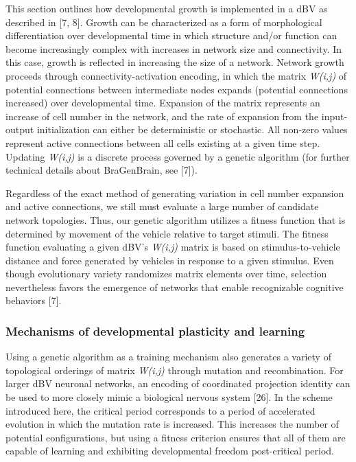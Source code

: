\documentclass{article}
\begin{document}
This section outlines how developmental growth is implemented in a dBV as described in [7, 8]. Growth can be characterized as a form of morphological differentiation over developmental time in which structure and/or function can become increasingly complex with increases in network size and connectivity. In this case, growth is reflected in increasing the size of a network. Network growth proceeds through connectivity-activation encoding, in which the matrix {\it W(i,j)} of potential connections between intermediate nodes expands (potential connections increased) over developmental time. Expansion of the matrix represents an increase of cell number in the network, and the rate of expansion from the input-output initialization can either be deterministic or stochastic. All non-zero values represent active connections between all cells existing at a given time step. Updating {\it W(i,j)} is a discrete process governed by a genetic algorithm (for further technical details about BraGenBrain, see [7]). 

Regardless of the exact method of generating variation in cell number expansion and active connections, we still must evaluate a large number of candidate network topologies. Thus, our genetic algorithm utilizes a fitness function that is determined by movement of the vehicle relative to target stimuli. The fitness function evaluating a given dBV's {\it W(i,j)} matrix is based on stimulus-to-vehicle distance and force generated by vehicles in response to a given stimulus. Even though evolutionary variety randomizes matrix elements over time, selection nevertheless favors the emergence of networks that enable recognizable cognitive behaviors [7]. 

\subsubsection*{Mechanisms of developmental plasticity and learning}

Using a genetic algorithm as a training mechanism also generates a variety of topological orderings of matrix {\it W(i,j)} through mutation and recombination. For larger dBV neuronal networks, an encoding of coordinated projection identity can be used to more closely mimic a biological nervous system [26]. In the scheme introduced here, the critical period corresponds to a period of accelerated evolution in which the mutation rate is increased. This increases the number of potential configurations, but using a fitness criterion ensures that all of them are capable of learning and exhibiting developmental freedom post-critical period. 
\end{document}
